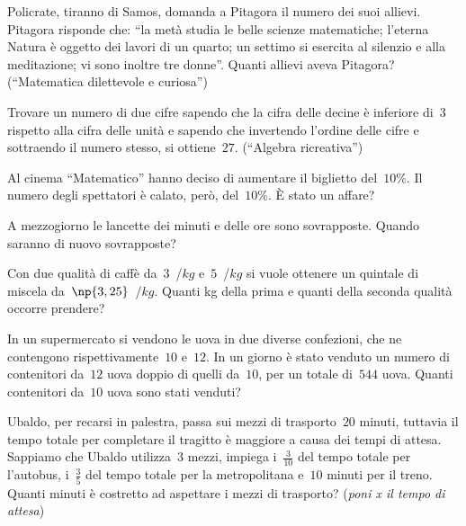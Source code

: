 \begin{multicols}{2}
\begin{esercizio}[\Ast]
\label{ese:16.52}
Policrate, tiranno di Samos, domanda a Pitagora il numero dei suoi allievi. Pitagora risponde che: ``la metà studia le belle scienze matematiche; l'eterna Natura è oggetto dei lavori di un quarto; un settimo si esercita al silenzio e alla meditazione; vi sono inoltre tre donne''. Quanti allievi aveva Pitagora? (``Matematica dilettevole e curiosa'')
\end{esercizio}

\begin{esercizio}
\label{ese:16.53}
Trovare un numero di due cifre sapendo che la cifra delle decine è inferiore di~$3$ rispetto alla cifra delle unità e sapendo che invertendo l'ordine delle cifre e sottraendo il numero stesso, si ottiene~$27$. (``Algebra ricreativa'')
\end{esercizio}

\begin{esercizio}
\label{ese:16.54}
Al cinema ``Matematico'' hanno deciso di aumentare il biglietto del~$10\%$. Il numero degli spettatori è calato, però, del~$10\%$. È stato un affare?
\end{esercizio}

\begin{esercizio}
\label{ese:16.55}
A mezzogiorno le lancette dei minuti e delle ore sono sovrapposte. Quando saranno di nuovo sovrapposte?
\end{esercizio}

\begin{esercizio}
\label{ese:16.56}
Con due qualità di caffè da~$3$~\officialeuro/$\unit{kg}$ e~$5$~\officialeuro/$\unit{kg}$ si vuole ottenere un quintale di miscela da~$\np{3,25}$~\officialeuro/$\unit{kg}$. Quanti kg della prima e quanti della seconda qualità occorre prendere?
\end{esercizio}

\begin{esercizio}[\Ast]
\label{ese:16.57}
In un supermercato si vendono le uova in due diverse confezioni, che ne contengono rispettivamente~$10$ e~$12$. In un giorno è stato venduto un numero di contenitori da~$12$ uova doppio di quelli da~$10$, per un totale di~$544$ uova. Quanti contenitori da~$10$ uova sono stati venduti?
\end{esercizio}

\begin{esercizio}[\Ast]
\label{ese:16.58}
Ubaldo, per recarsi in palestra, passa sui mezzi di trasporto~$20$ minuti, tuttavia il tempo totale per completare il tragitto è maggiore a causa dei tempi di attesa. Sappiamo che Ubaldo utilizza~$3$ mezzi, impiega i~$\frac{3}{10}$ del tempo totale per l'autobus, i~$\frac{3}{5}$ del tempo totale per la metropolitana e~$10$ minuti per il treno. Quanti minuti è costretto ad aspettare i mezzi di trasporto? (\emph{poni x il tempo di attesa})
\end{esercizio}


\end{multicols}
